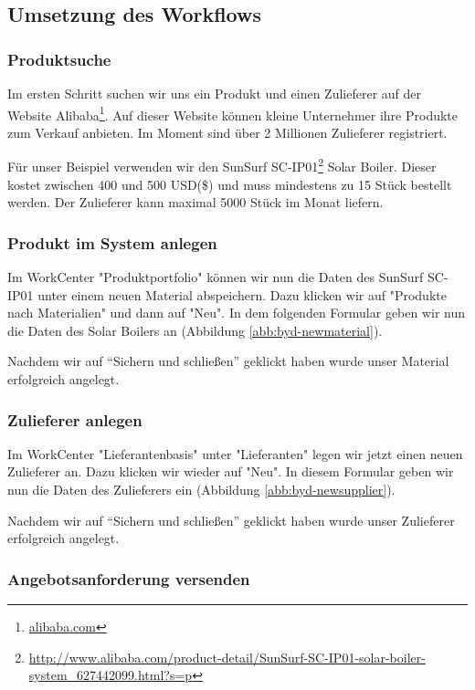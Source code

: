 \subsection{Umsetzung des Workflows}
\label{sec:byd-bsp-umsetzung}

\subsubsection{Produktsuche}

Im ersten Schritt suchen wir uns ein Produkt und einen Zulieferer auf der Website Alibaba\footnote{\url{alibaba.com}}. Auf dieser Website können kleine Unternehmer ihre Produkte zum Verkauf anbieten. Im Moment sind über 2 Millionen Zulieferer registriert.

Für unser Beispiel verwenden wir den SunSurf SC-IP01\footnote{\url{http://www.alibaba.com/product-detail/SunSurf-SC-IP01-solar-boiler-system_627442099.html?s=p}} Solar Boiler. Dieser kostet zwischen 400 und 500 USD(\$) und muss mindestens zu 15 Stück bestellt werden. Der Zulieferer kann maximal 5000 Stück im Monat liefern.

\subsubsection{Produkt im System anlegen}

Im WorkCenter "Produktportfolio" können wir nun die Daten des SunSurf SC-IP01 unter einem neuen Material abspeichern. Dazu klicken wir auf "Produkte nach Materialien" und dann auf "Neu". In dem folgenden Formular geben wir nun die Daten des Solar Boilers an (Abbildung \ref{abb:byd-newmaterial}).

Nachdem wir auf "`Sichern und schließen"' geklickt haben wurde unser Material erfolgreich angelegt.

\subsubsection{Zulieferer anlegen}

Im WorkCenter "Lieferantenbasis" unter "Lieferanten" legen wir jetzt einen neuen Zulieferer an. Dazu klicken wir wieder auf "Neu". In diesem Formular geben wir nun die Daten des Zulieferers ein (Abbildung \ref{abb:byd-newsupplier}).

Nachdem wir auf "`Sichern und schließen"' geklickt haben wurde unser Zulieferer erfolgreich angelegt.

\subsubsection{Angebotsanforderung versenden}

